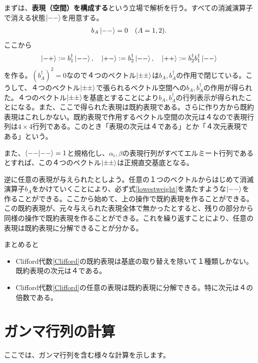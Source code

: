 \documentclass[report,paper=a4, fontsize=12pt, line_length=16cm, number_of_lines=33,dvipdfmx]{jlreq}
\numberwithin{equation}{chapter}
\newcommand{\strong}[1]{{\sffamily \bfseries #1}}
\begin{document}
まずは、\strong{表現（空間）を構成する}という立場で解析を行う。すべての消滅演算子で消える状態$\ket{--}$を用意する。
\begin{align}
  b_A\ket{--}=0\quad (A=1,2).
\end{align}
ここから
\begin{align}
  \ket{-+}:=b_{1}^{\dag}\ket{--},\quad 
  \ket{+-}:=b_{2}^{\dag}\ket{--},\quad 
  \ket{++}:=b_{2}^{\dag}b_{1}^{\dag}\ket{--}
\end{align}
を作る。$(b_A^{\dag})^2=0$なので４つのベクトル$\ket{\pm\pm}$は$b_A,b_A^{\dag}$の作用で閉じている。こうして、４つのベクトル$\ket{\pm\pm}$で張られるベクトル空間への$b_A,b_A^{\dag}$の作用が得られた。４つのベクトル$\ket{\pm\pm}$を基底とすることにより$b_A,b_A^{\dag}$の行列表示が得られたことになる。また、ここで得られた表現は既約表現である。さらに作り方から既約表現はこれしかない。既約表現で作用するベクトル空間の次元は４なので表現行列は$4\times 4$行列である。このとき「表現の次元は４である」とか「４次元表現である」という。

また、$\braket{--}{--}=1$と規格化し、$\alpha_i,\beta$の表現行列がすべてエルミート行列であるとすれば、この４つのベクトル$\ket{\pm\pm}$は正規直交基底となる。

逆に任意の表現が与えられたとしよう。任意の１つのベクトルからはじめて消滅演算子$b_A$をかけていくことにより、必ず式\eqref{lowestweight}を満たすような$\ket{--}$を作ることができる。ここから始めて、上の操作で既約表現を作ることができる。この既約表現が、元々与えられた表現全体で無かったとすると、残りの部分から同様の操作で既約表現を作ることができる。これを繰り返すことにより、任意の表現は既約表現に分解できることが分かる。

まとめると
\begin{itemize}
  \item Clifford代数\eqref{Clifford}の既約表現は基底の取り替えを除いて１種類しかない。既約表現の次元は４である。
  \item Clifford代数\eqref{Clifford}の任意の表現は既約表現に分解できる。特に次元は４の倍数である。
\end{itemize}


\section{ガンマ行列の計算}
\label{app:gammacalc}

ここでは、ガンマ行列を含む様々な計算を示します。
\end{document}
